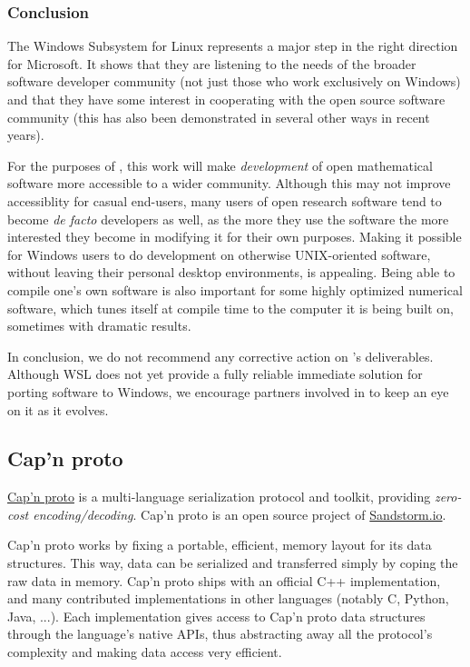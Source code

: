 \documentclass{deliverablereport}
\begin{document}
\subsubsection{Conclusion}

The Windows Subsystem for Linux represents a major step in the right
direction for Microsoft.  It shows that they are listening to the
needs of the broader software developer community (not just those who
work exclusively on Windows) and that they have some interest in
cooperating with the open source software community (this has also
been demonstrated in several other ways in recent years).

For the purposes of \ODK, this work will make \emph{development} of
open mathematical software more accessible to a wider community.
Although this may not improve accessiblity for casual end-users, many
users of open research software tend to become \emph{de facto}
developers as well, as the more they use the software the more
interested they become in modifying it for their own purposes.  Making
it possible for Windows users to do development on otherwise
UNIX-oriented software, without leaving their personal desktop
environments, is appealing.  Being able to compile one's own software
is also important for some highly optimized numerical software, which
tunes itself at compile time to the computer it is being built on,
sometimes with dramatic results.

In conclusion, we do not recommend any corrective action on \ODK's
deliverables. Although WSL does not yet provide a fully reliable
immediate solution for porting \ODK software to Windows, we encourage
partners involved in  to
keep an eye on it as it evolves.


\subsection{Cap'n proto}
\label{sec:capnproto}

\href{http://capnproto.org/}{Cap'n proto} is a multi-language
serialization protocol and toolkit, providing \emph{zero-cost
  encoding/decoding}. Cap'n proto is an open source project of
\href{http://sandstorm.io}{Sandstorm.io}.

Cap'n proto works by fixing a portable, efficient, memory layout for
its data structures. This way, data can be serialized and transferred
simply by coping the raw data in memory. Cap'n proto ships with an
official C++ implementation, and many contributed implementations in
other languages (notably C, Python, Java, ...). Each implementation
gives access to Cap'n proto data structures through the language's
native APIs, thus abstracting away all the protocol's complexity and
making data access very efficient.
\end{document}
